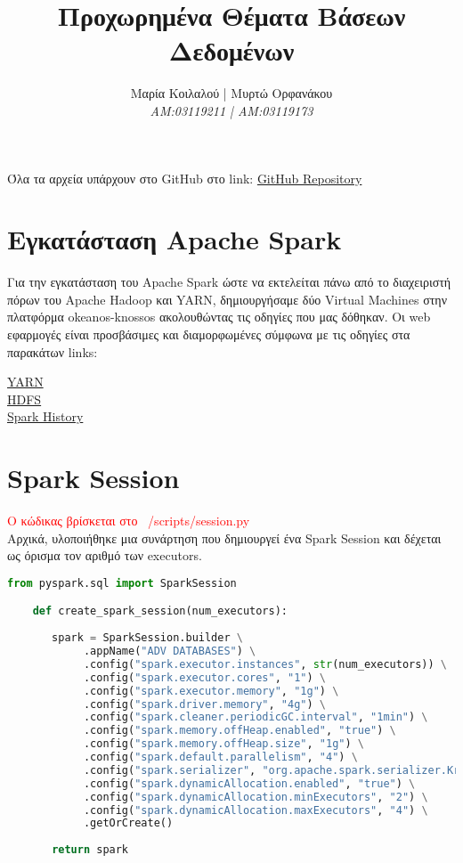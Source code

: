 \documentclass{article}
\title{Προχωρημένα Θέματα Βάσεων Δεδομένων}
\author{Μαρία Κοιλαλού | Μυρτώ Ορφανάκου\\
\textit{AM:03119211 | ΑM:03119173}}
\begin{document}
\maketitle

\vspace{3\baselineskip}

Όλα τα αρχεία υπάρχουν στο GitHub στο link: 
\href{https://github.com/MariaKoilalou/AdvancedDB}{GitHub Repository}

\section{Εγκατάσταση Apache Spark}

Για την εγκατάσταση του Apache Spark ώστε να εκτελείται πάνω από το διαχειριστή πόρων του Apache Hadoop και YARN,
δημιουργήσαμε δύο Virtual Machines στην πλατφόρμα okeanos-knossos ακολουθώντας τις οδηγίες που μας δόθηκαν.
Οι web εφαρμογές είναι προσβάσιμες και διαμορφωμένες σύμφωνα με τις οδηγίες στα παρακάτων links: 

\begin{center}
\href{http://83.212.81.191:8088}{YARN} \\
\href{http://83.212.81.191:9870}{HDFS} \\
\href{http://83.212.81.191:18080}{Spark History} \\
\end{center}


\section*{Spark Session}
\textcolor{red}{Ο κώδικας βρίσκεται στο  /scripts/session.py} \\
Αρχικά, υλοποιήθηκε μια συνάρτηση που δημιουργεί ένα Spark Session και δέχεται ως όρισμα τον αριθμό των executors.

\begin{lstlisting}[language = Python]
    from pyspark.sql import SparkSession

    def create_spark_session(num_executors):
       
       spark = SparkSession.builder \
            .appName("ADV DATABASES") \
            .config("spark.executor.instances", str(num_executors)) \
            .config("spark.executor.cores", "1") \
            .config("spark.executor.memory", "1g") \
            .config("spark.driver.memory", "4g") \
            .config("spark.cleaner.periodicGC.interval", "1min") \
            .config("spark.memory.offHeap.enabled", "true") \
            .config("spark.memory.offHeap.size", "1g") \
            .config("spark.default.parallelism", "4") \
            .config("spark.serializer", "org.apache.spark.serializer.KryoSerializer") \
            .config("spark.dynamicAllocation.enabled", "true") \
            .config("spark.dynamicAllocation.minExecutors", "2") \
            .config("spark.dynamicAllocation.maxExecutors", "4") \
            .getOrCreate()
          
       return spark
\end{lstlisting}
\end{document}
